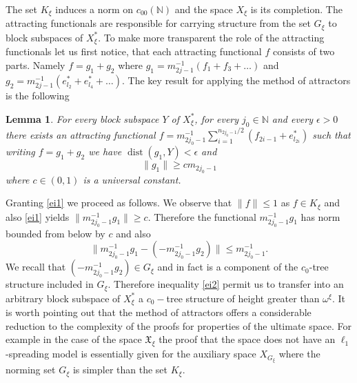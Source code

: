 \documentclass[a4paper]{amsart}
\theoremstyle{plain}
\newtheorem*{lemma*}{Lemma}
\newcommand{\N}{\mathbb{N}}
\newcommand{\e}{\epsilon}
\newcommand{\norm}[1][\cdot]{\lVert #1\rVert}
\DeclareMathOperator{\dist}{dist}
\begin{document}
The set $K_{\xi}$ induces a norm on $c_{00}(\N)$  and the space
$X_{\xi}$ is its completion.
The attracting functionals are responsible for carrying
structure from the set $G_{\xi}$ to  block subspaces of
$X_{\xi}^{*}$. To make more transparent the role of the attracting functionals
let us first notice, that each attracting functional $f$ consists of two parts.
Namely $f=g_1+g_{2}$  where
$g_{1}=m_{2j-1}^{-1}(f_{1}+f_{3}+\dots)$ and
$g_{2}=m_{2j-1}^{-1}(e^{*}_{l_{2}}+e^{*}_{l_{4}}+\dots)$.
The key result for applying the method of attractors is the following
\begin{lemma*}
For every block subspace $Y$ of $X_{\xi}^{*}$, for every $j_0\in\N$  and every $\e>0$ there exists an attracting  functional $f=m_{2j_{0}-1}^{-1}\sum_{i=1}^{n_{2j_{0}-1}/2}(f_{2i-1}+e_{l_{2i}}^{*})$ such that writing $f=g_{1}+g_{2}$ we have $\dist(g_{1},Y)<\e$ and
\begin{equation}\label{ei1} \norm[g_{1}]\geq cm_{2j_0-1}
\end{equation}
where $c\in (0,1)$ is a universal constant.
\end{lemma*}
Granting \eqref{ei1} we proceed as follows. We observe that $\norm[f]\leq 1$ as $f\in
K_{\xi}$ and also \eqref{ei1} yields $\norm[m_{2j_0-1}^{-1}g_{1}]\geq c$. Therefore the
functional $m_{2j_0-1}^{-1}g_{1}$ has norm bounded from below by $c$ and also
\begin{equation}
\label{ei2} \norm[m_{2j_0-1}^{-1}g_{1}-(-m_{2j_0-1}^{-1}g_{2})]\leq m_{2j_0-1}^{-1}.
\end{equation}
We recall that $(-m_{2j_0-1}^{-1}g_{2})\in G_{\xi}$ and in fact is a component of the
$c_0$-tree structure included in $G_{\xi}$. Therefore inequality \eqref{ei2} permit us to
transfer into an arbitrary block subspace of $X_{\xi}^{*}$ a $c_0-$tree structure of
height greater than $\omega^{\xi}$.  It is worth pointing out that the method of attractors offers a
considerable reduction to the complexity of the proofs for properties of the ultimate
space. For example in the case of the space $\mathfrak{X}_{\xi}$  the proof that the
space does not have an $\ell_{1}$-spreading model is essentially given for the auxiliary
space $X_{G_{\xi}}$ where the norming set $G_{\xi}$ is simpler than the set  $K_{\xi}$.
\end{document}
